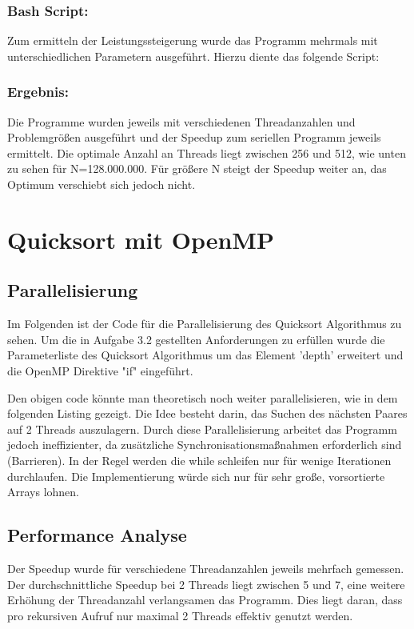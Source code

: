 \documentclass[12pt,a4paper]{article}
\begin{document}
\subsubsection{Bash Script:}
Zum ermitteln der Leistungssteigerung wurde das Programm mehrmals mit unterschiedlichen Parametern ausgeführt. Hierzu diente das folgende Script:

\subsubsection{Ergebnis:}
Die Programme wurden jeweils mit verschiedenen Threadanzahlen und Problemgrößen ausgeführt und der Speedup zum seriellen Programm jeweils ermittelt. Die optimale Anzahl an Threads liegt zwischen 256 und 512, wie unten zu sehen für N=128.000.000. Für größere N steigt der Speedup weiter an, das Optimum verschiebt sich jedoch nicht.

\newpage
\section{Quicksort mit OpenMP}
\subsection{Parallelisierung}
Im Folgenden ist der Code für die Parallelisierung des Quicksort Algorithmus zu sehen. Um die in Aufgabe 3.2 gestellten Anforderungen zu erfüllen wurde die Parameterliste des Quicksort Algorithmus um das Element 'depth' erweitert und die OpenMP Direktive "if" eingeführt.

Den obigen code könnte man theoretisch noch weiter parallelisieren, wie in dem folgenden Listing gezeigt. Die Idee besteht darin, das Suchen des nächsten Paares auf 2 Threads auszulagern. Durch diese Parallelisierung arbeitet das Programm jedoch ineffizienter, da zusätzliche Synchronisationsmaßnahmen erforderlich sind (Barrieren). In der Regel werden die while schleifen nur für wenige Iterationen durchlaufen. Die Implementierung würde sich nur für sehr große, vorsortierte Arrays lohnen.

\subsection{Performance Analyse}
Der Speedup wurde für verschiedene Threadanzahlen jeweils mehrfach gemessen. Der durchschnittliche Speedup bei 2 Threads liegt zwischen 5 und 7, eine weitere Erhöhung der Threadanzahl verlangsamen das Programm. Dies liegt daran, dass pro rekursiven Aufruf nur maximal 2 Threads effektiv genutzt werden.

\end{document}

